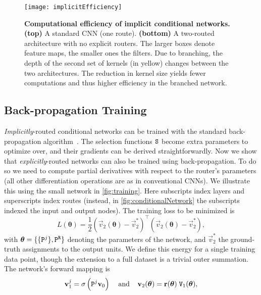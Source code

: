 \documentclass[thesis]{subfiles}
\begin{document}
	\begin{figure}[tbp]
	\centerline{
	\texttt{[image: implicitEfficiency]}
	}
	\caption{{\bf Computational efficiency of implicit conditional networks.} 
	{\bf (top)} A standard CNN (one route).
	{\bf (bottom)} A two-routed architecture with no explicit routers.
	The larger boxes denote feature maps, the smaller ones the filters.
	Due to branching, the depth of the second set of kernels (in yellow) changes between the two architectures.
	The reduction in kernel size yields fewer computations and thus higher efficiency in the branched network.
	}
	\label{fig:implicitEfficiency}
	\end{figure}
	
	\subsection{Back-propagation Training}\label{sec:training}
	{\em Implicitly}-routed conditional networks can be trained with the standard back-propagation algorithm~\cite{Krizhevsky2012,Szegedy2014going}. 
	The selection functions $\mat S$ become extra parameters to optimize over, and their gradients can be derived straightforwardly. 
	Now we show that {\em explicitly}-routed networks can also be trained using back-propagation.  
	To do so we need to compute partial derivatives with respect to the router's parameters (all other differentiation operations are as in conventional CNNs). 
	We illustrate this using the small network in \cref{fig:training}. 
	Here subscripts index layers and superscripts index routes (instead, in \cref{fig:conditionalNetwork} the subscripts indexed the input and output nodes).
	The training loss to be minimized is
	\begin{equation}
	L(\boldsymbol\theta)  = \frac{1}{2} \left(\vec v_2(\boldsymbol\theta) - \vec v_2^*\right)^\top \left(\vec v_2(\boldsymbol\theta) - \vec v_2^*\right),
	\end{equation}
	with $\boldsymbol\theta = \{ \{ \mat P^j \}, \mat P^{\tt R} \} $ denoting the parameters of the network, and $\vec v_2^*$ the ground-truth assignments to the output units. We define this energy for a single training data point, though the extension to a full dataset is a trivial outer summation.
	The network's forward mapping is
	\begin{equation}
	\vec v_1^j = \sigma \left( \mat P^j \vec v_0 \right) \;\;\;\; \textrm{and} \;\;\;\; \vec v_2(\boldsymbol\theta) = \vec r(\boldsymbol\theta) \; \mat V_1(\boldsymbol\theta),
	\end{equation} 
\end{document}
